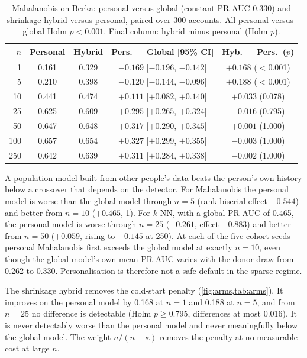\begin{table}[!t]
\caption{Mahalanobis on Berka: personal versus global (constant PR-AUC 0.330) and shrinkage hybrid versus personal, paired over 300 accounts. All personal-versus-global Holm $p<0.001$. Final column: hybrid minus personal (Holm $p$).}
\label{tab:arms}
\centering\footnotesize\setlength{\tabcolsep}{2.6pt}
\begin{tabular}{r cc cc}
\toprule
$n$ & Personal & Hybrid & Pers.\ $-$ Global [95\% CI] & Hyb.\ $-$ Pers.\ ($p$) \\
\midrule
1   & 0.161 & 0.329 & $-0.169$ [$-0.196$, $-0.142$] & $+0.168$ ($<$0.001) \\
5   & 0.210 & 0.398 & $-0.120$ [$-0.144$, $-0.096$] & $+0.188$ ($<$0.001) \\
10  & 0.441 & 0.474 & $+0.111$ [$+0.082$, $+0.140$] & $+0.033$ (0.078) \\
25  & 0.625 & 0.609 & $+0.295$ [$+0.265$, $+0.324$] & $-0.016$ (0.795) \\
50  & 0.647 & 0.648 & $+0.317$ [$+0.290$, $+0.345$] & $+0.001$ (1.000) \\
100 & 0.657 & 0.654 & $+0.327$ [$+0.299$, $+0.355$] & $-0.003$ (1.000) \\
250 & 0.642 & 0.639 & $+0.311$ [$+0.284$, $+0.338$] & $-0.002$ (1.000) \\
\bottomrule
\end{tabular}
\end{table}

A population model built from other people's data beats the person's own history below a crossover that depends on the detector. For Mahalanobis the personal model is worse than the global model through $n=5$ (rank-biserial effect $-0.544$) and better from $n=10$ ($+0.465$, \cref{tab:arms}). For $k$-NN, with a global PR-AUC of 0.465, the personal model is worse through $n=25$ ($-0.261$, effect $-0.883$) and better from $n=50$ ($+0.059$, rising to $+0.145$ at 250). At each of the five cohort seeds personal Mahalanobis first exceeds the global model at exactly $n=10$, even though the global model's own mean PR-AUC varies with the donor draw from 0.262 to 0.330. Personalisation is therefore not a safe default in the sparse regime.

The shrinkage hybrid removes the cold-start penalty (\cref{fig:arms,tab:arms}). It improves on the personal model by 0.168 at $n=1$ and 0.188 at $n=5$, and from $n=25$ no difference is detectable (Holm $p\ge0.795$, differences at most 0.016). It is never detectably worse than the personal model and never meaningfully below the global model. The weight $n/(n+\kappa)$ removes the penalty at no measurable cost at large $n$.

